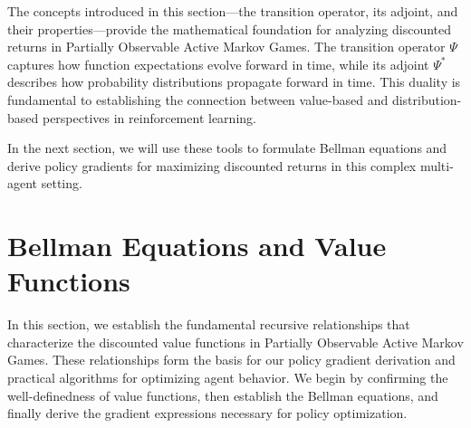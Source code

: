 \documentclass[a4paper,12pt]{report}
\begin{document}
The concepts introduced in this section—the transition operator, its adjoint, and
their properties—provide the mathematical foundation for analyzing discounted returns
in Partially Observable Active Markov Games. The transition operator $\Psi$
captures how function expectations evolve forward in time, while its adjoint $\Psi
    ^{*}$ describes how probability distributions propagate forward in time. This
duality is fundamental to establishing the connection between value-based and
distribution-based perspectives in reinforcement learning.

In the next section, we will use these tools to formulate Bellman equations and derive
policy gradients for maximizing discounted returns in this complex multi-agent setting.
\section{Bellman Equations and Value Functions}
In this section, we establish the fundamental recursive relationships that characterize
the discounted value functions in Partially Observable Active Markov Games.
These relationships form the basis for our policy gradient derivation and
practical algorithms for optimizing agent behavior. We begin by confirming the well-definedness
of value functions, then establish the Bellman equations, and finally derive the
gradient expressions necessary for policy optimization.
\end{document}
